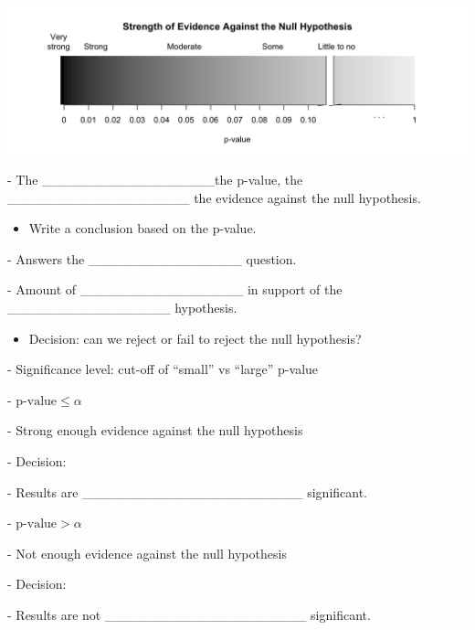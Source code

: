 \documentclass[
]{report}
\providecommand{\tightlist}{%
  \setlength{\itemsep}{0pt}\setlength{\parskip}{0pt}}
\newcommand{\rgi}{\hspace{24pt}}  %
\begin{document}
\begin{center}\includegraphics[width=0.75\linewidth]{images/soe_gradient_gray} \end{center}

\rgi \rgi - The \_\_\_\_\_\_\_\_\_\_\_\_\_\_\_\_\_\_the p-value, the \_\_\_\_\_\_\_\_\_\_\_\_\_\_\_\_\_\_\_ the evidence against the null hypothesis.

\begin{itemize}
\tightlist
\item
  Write a conclusion based on the p-value.
\end{itemize}

\rgi \rgi - Answers the \_\_\_\_\_\_\_\_\_\_\_\_\_\_\_\_ question.

\rgi \rgi - Amount of \_\_\_\_\_\_\_\_\_\_\_\_\_\_\_\_\_ in support of the \_\_\_\_\_\_\_\_\_\_\_\_\_\_\_\_\_ hypothesis.

\begin{itemize}
\tightlist
\item
  Decision: can we reject or fail to reject the null hypothesis?
\end{itemize}

\rgi - Significance level: cut-off of ``small'' vs ``large'' p-value

\rgi \rgi - \(\text{p-value} \le \alpha\)

\rgi \rgi \rgi - Strong enough evidence against the null hypothesis

\rgi \rgi \rgi - Decision:

\vspace{0.2in}

\rgi \rgi \rgi - Results are \_\_\_\_\_\_\_\_\_\_\_\_\_\_\_\_\_\_\_\_\_\_\_ significant.

\rgi \rgi - \(\text{p-value} > \alpha\)

\rgi \rgi \rgi - Not enough evidence against the null hypothesis

\rgi \rgi \rgi - Decision:

\vspace{0.2in}

\rgi \rgi \rgi - Results are not \_\_\_\_\_\_\_\_\_\_\_\_\_\_\_\_\_\_\_\_\_ significant.
\end{document}

